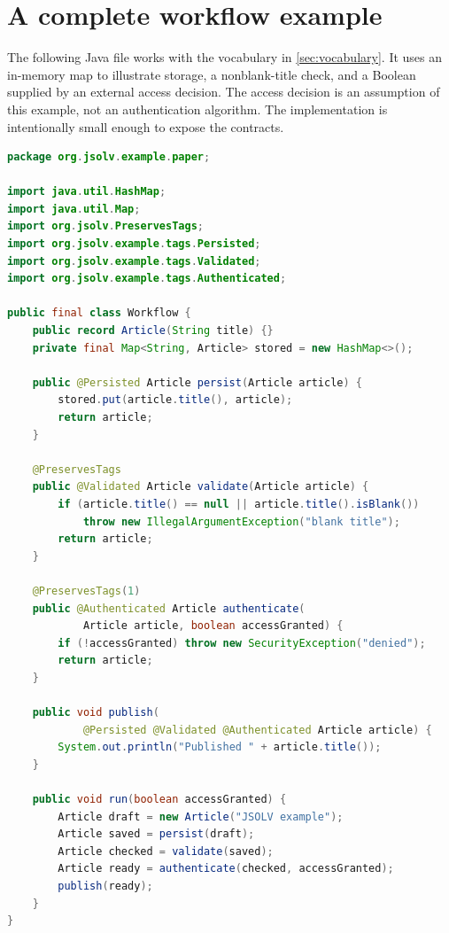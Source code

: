 \documentclass[11pt]{article}
\begin{document}
\section{A complete workflow example}
\label{sec:example}

The following Java file works with the vocabulary in \cref{sec:vocabulary}.
It uses an in-memory map to illustrate storage, a nonblank-title check, and a
Boolean supplied by an external access decision. The access decision is an
assumption of this example, not an authentication algorithm. The implementation
is intentionally small enough to expose the contracts.

\begin{lstlisting}[language=Java,float=tp,caption={A complete illustrative workflow.},label={lst:workflow}]
package org.jsolv.example.paper;

import java.util.HashMap;
import java.util.Map;
import org.jsolv.PreservesTags;
import org.jsolv.example.tags.Persisted;
import org.jsolv.example.tags.Validated;
import org.jsolv.example.tags.Authenticated;

public final class Workflow {
    public record Article(String title) {}
    private final Map<String, Article> stored = new HashMap<>();

    public @Persisted Article persist(Article article) {
        stored.put(article.title(), article);
        return article;
    }

    @PreservesTags
    public @Validated Article validate(Article article) {
        if (article.title() == null || article.title().isBlank())
            throw new IllegalArgumentException("blank title");
        return article;
    }

    @PreservesTags(1)
    public @Authenticated Article authenticate(
            Article article, boolean accessGranted) {
        if (!accessGranted) throw new SecurityException("denied");
        return article;
    }

    public void publish(
            @Persisted @Validated @Authenticated Article article) {
        System.out.println("Published " + article.title());
    }

    public void run(boolean accessGranted) {
        Article draft = new Article("JSOLV example");
        Article saved = persist(draft);
        Article checked = validate(saved);
        Article ready = authenticate(checked, accessGranted);
        publish(ready);
    }
}
\end{lstlisting}
\end{document}
